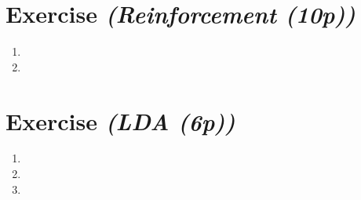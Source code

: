\documentclass{article}
\begin{document}
\section{Exercise \textit{(Reinforcement (10p))}}
\begin{enumerate}
    \item
    \item
\end{enumerate}

\section{Exercise \textit{(LDA (6p))}}
\begin{enumerate}
    \item
    \item
    \item
\end{enumerate}
\end{document}
